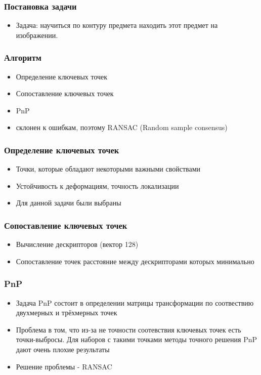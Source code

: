 \begin{frame}\frametitle{Постановка задачи}
    \begin{itemize}
        \item Задача: научиться по контуру предмета находить этот предмет на изображении.
    \end{itemize}
\end{frame}
\begin{frame}\frametitle{Алгоритм}
    \begin{itemize}
        \item Определение ключевых точек
        \item Сопоставление ключевых точек
        \item PnP
        \item склонен к ошибкам, поэтому RANSAC (Random sample consensus)
    \end{itemize}
\end{frame}
\begin{frame}\frametitle{Определение ключевых точек}
    \begin{itemize}
        \item Точки, которые обладают некоторыми важными свойствами
        \item Устойчивость к деформациям, точность локализации
        \item Для данной задачи были выбраны
    \end{itemize}
\end{frame}
\begin{frame}\frametitle{Сопоставление ключевых точек}
    \begin{itemize}
        \item Вычисление дескрипторов (вектор 128)
        \item Сопоставление точек расстояние между дескрипторами которых минимально
    \end{itemize}
\end{frame}
\begin{frame}\frametitle{PnP}
    \begin{itemize}
        \item Задача PnP состоит в определении матрицы трансформации по соотвествию двухмерных и трёхмерных точек
        \item Проблема в том, что из-за не точности соотевствия ключевых точек есть точки-выбросы. 
            Для наборов с такими точками методы точного решения PnP дают очень плохие результаты
        \item Решение проблемы - RANSAC
    \end{itemize}
\end{frame}
